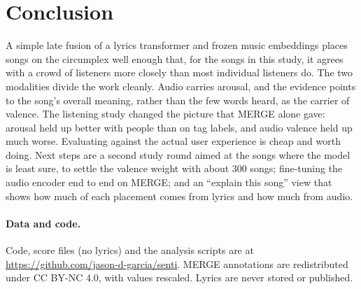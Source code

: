 \documentclass[10pt,twocolumn]{article}
\begin{document}
\section{Conclusion}

A simple late fusion of a lyrics transformer and frozen music embeddings places songs on the circumplex well enough that, for the songs in this study, it agrees with a crowd of listeners more closely than most individual listeners do. The two modalities divide the work cleanly. Audio carries arousal, and the evidence points to the song's overall meaning, rather than the few words heard, as the carrier of valence. The listening study changed the picture that MERGE alone gave: arousal held up better with people than on tag labels, and audio valence held up much worse. Evaluating against the actual user experience is cheap and worth doing. Next steps are a second study round aimed at the songs where the model is least sure, to settle the valence weight with about 300 songs; fine-tuning the audio encoder end to end on MERGE; and an ``explain this song'' view that shows how much of each placement comes from lyrics and how much from audio.

\paragraph{Data and code.} Code, score files (no lyrics) and the analysis scripts are at \url{https://github.com/jason-d-garcia/senti}. MERGE annotations are redistributed under CC BY-NC 4.0, with values rescaled. Lyrics are never stored or published.

\small


\end{document}
